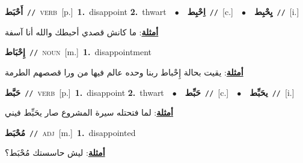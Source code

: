\documentclass[10pt,a4paper,twoside]{article} %
\begin{document}
\begin{multicols}{2}
{\setlength\topsep{0pt}\textbf{\foreignlanguage{arabic}{أَحْبَط}}\ {\color{gray}\texttt{//}\color{black}}\ \textsc{verb}\ [p.]\ \textbf{1.}~disappoint  \textbf{2.}~thwart\ \ $\bullet$\ \ \setlength\topsep{0pt}\textbf{\foreignlanguage{arabic}{اِحْبِط}}\ {\color{gray}\texttt{//}\color{black}}\ [c.]\ \ $\bullet$\ \ \setlength\topsep{0pt}\textbf{\foreignlanguage{arabic}{يِحْبِط}}\ {\color{gray}\texttt{//}\color{black}}\ [i.]\  \begin{flushright}\color{gray}\foreignlanguage{arabic}{\textbf{\underline{\foreignlanguage{arabic}{أمثلة}}}: ما كانش قصدي أحبطك والله أنا آسفة}\end{flushright}\color{black}} \vspace{2mm}

{\setlength\topsep{0pt}\textbf{\foreignlanguage{arabic}{إِحْبَاط}}\ {\color{gray}\texttt{//}\color{black}}\ \textsc{noun}\ [m.]\ \textbf{1.}~disappointment\  \begin{flushright}\color{gray}\foreignlanguage{arabic}{\textbf{\underline{\foreignlanguage{arabic}{أمثلة}}}: يقيت بحالة إِحْباط ربنا وحده عالم فيها من ورا قصصهم الطرمة}\end{flushright}\color{black}} \vspace{2mm}

{\setlength\topsep{0pt}\textbf{\foreignlanguage{arabic}{حَبَّط}}\ {\color{gray}\texttt{//}\color{black}}\ \textsc{verb}\ [p.]\ \textbf{1.}~disappoint  \textbf{2.}~thwart\ \ $\bullet$\ \ \setlength\topsep{0pt}\textbf{\foreignlanguage{arabic}{حَبِّط}}\ {\color{gray}\texttt{//}\color{black}}\ [c.]\ \ $\bullet$\ \ \setlength\topsep{0pt}\textbf{\foreignlanguage{arabic}{يحَبِّط}}\ {\color{gray}\texttt{//}\color{black}}\ [i.]\  \begin{flushright}\color{gray}\foreignlanguage{arabic}{\textbf{\underline{\foreignlanguage{arabic}{أمثلة}}}: لما فتحتله سيرة المشروع صار يحَبِّط فيني}\end{flushright}\color{black}} \vspace{2mm}

{\setlength\topsep{0pt}\textbf{\foreignlanguage{arabic}{مُحْبَط}}\ {\color{gray}\texttt{//}\color{black}}\ \textsc{adj}\ [m.]\ \textbf{1.}~disappointed\  \begin{flushright}\color{gray}\foreignlanguage{arabic}{\textbf{\underline{\foreignlanguage{arabic}{أمثلة}}}: ليش حاسستك مُحْبَط؟}\end{flushright}\color{black}} \vspace{2mm}


\end{multicols}
\end{document}

